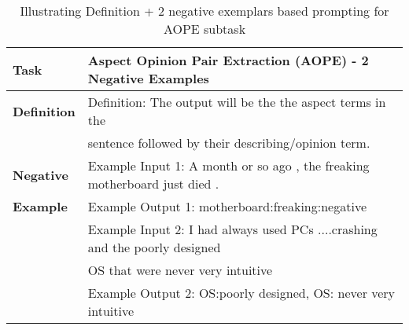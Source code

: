 \documentclass[11pt]{article}
\begin{document}
\begin{table*}[]
\resizebox{\linewidth}{!}
{
\begin{tabular}{ll}
\hline
\textbf{Task} & Aspect Opinion Pair Extraction (AOPE) - 2 Negative Examples \\ 
\hline                                                  
\textbf{Definition} & Definition: The output will be the the aspect terms in the \\
& sentence followed by their describing/opinion term.\\ 
\hline                                                                    
\textbf{Negative}   & Example Input 1: A month or so ago , the freaking motherboard just died . \\
\textbf{Example}    & Example Output 1: motherboard:freaking:negative \\
\textbf{}           & Example Input 2: I had always used PCs ....crashing and the poorly designed \\
\textbf{}           & OS that were never very intuitive               \\
\textbf{}           & Example Output 2: OS:poorly designed, OS: never very intuitive  \\ 
\hline  
\end{tabular}
}
\caption{
     Illustrating Definition + 2 negative exemplars based prompting for AOPE subtask}
\label{tab:absa3_aope}
\end{table*} 
\end{document}
